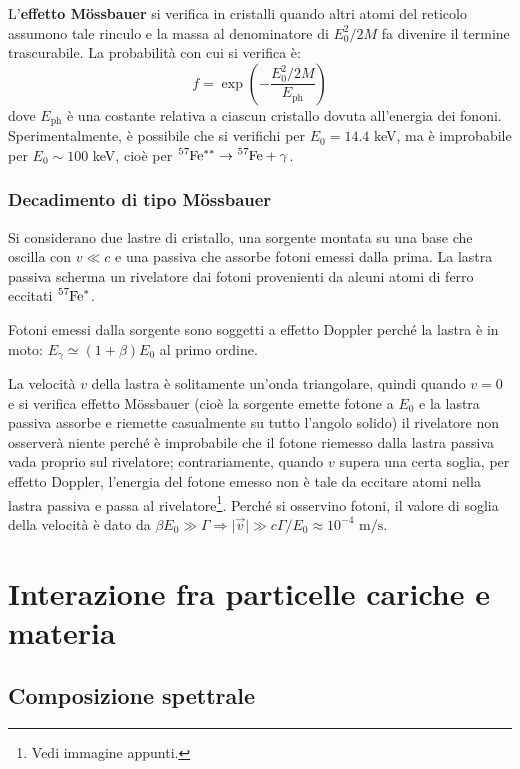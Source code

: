 \documentclass[10pt, a4paper]{scrartcl}
\numberwithin{equation}{subsection}
\theoremstyle{style1}
\begin{document}
L'\textbf{effetto M\"ossbauer} si verifica in cristalli quando altri atomi del reticolo assumono tale rinculo e la massa al denominatore di $E_0^2 / 2M$ fa divenire il termine trascurabile. La probabilit\`a con cui si verifica \`e:
\[
f = \exp\left(- \frac{E_0^2 / 2M}{E_\text{ph}}\right) 
\] 
dove $E_\text{ph}$ \`e una costante relativa a ciascun cristallo dovuta all'energia dei fononi. Sperimentalmente, \`e possibile che si verifichi per $E_0 = 14.4 $ keV, ma \`e improbabile per $E_0 \sim 100$ keV, cio\`e per $\ce{^{57}Fe^{**}}\to \ce{^{57}Fe}+ \gamma  $.

\subsubsection{Decadimento di tipo M\"ossbauer}
Si considerano due lastre di cristallo, una sorgente montata su una base che oscilla con $v \ll c$ e una passiva che assorbe fotoni emessi dalla prima. La lastra passiva scherma un rivelatore dai fotoni provenienti da alcuni atomi di ferro eccitati $\ce{^{57}Fe^*}$.

Fotoni emessi dalla sorgente sono soggetti a effetto Doppler perch\'e la lastra \`e in moto: $E_\gamma \simeq (1+\beta ) E_0$ al primo ordine.

La velocit\`a $v$ della lastra \`e solitamente un'onda triangolare, quindi quando $v=0$ e si verifica effetto M\"ossbauer (cio\`e la sorgente emette fotone a $E_0$ e la lastra passiva assorbe e riemette casualmente su tutto l'angolo solido) il rivelatore non osserver\`a niente perch\'e \`e improbabile che il fotone riemesso dalla lastra passiva vada proprio sul rivelatore; contrariamente, quando $v$ supera una certa soglia, per effetto Doppler, l'energia del fotone emesso non \`e tale da eccitare atomi nella lastra passiva e passa al rivelatore\footnote{Vedi immagine appunti.}. 
Perch\'e si osservino fotoni, il valore di soglia della velocit\`a \`e dato da $\beta  E_0 \gg \Gamma\Rightarrow  \lvert \vec{v} \rvert \gg c\Gamma / E_0\approx 10^{-4} \text{ m}/\text{s}$.

\newpage

\section{Interazione fra particelle cariche e materia}
\subsection{Composizione spettrale}\label{compspet}
\end{document}
